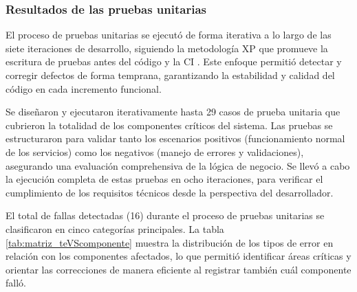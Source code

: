 \subsubsection{Resultados de las pruebas unitarias}

El proceso de pruebas unitarias se ejecutó de forma iterativa a lo largo de las siete iteraciones de desarrollo, 
siguiendo la metodología \ac{XP} que promueve la escritura de pruebas antes del código y la \ac{CI} \citep{beck2000extreme}. 
Este enfoque permitió detectar y corregir defectos de forma temprana, garantizando la estabilidad
y calidad del código en cada incremento funcional.

Se diseñaron y ejecutaron iterativamente hasta 29 casos de prueba unitaria que cubrieron la totalidad de los
componentes críticos del sistema. Las pruebas se estructuraron para validar tanto los escenarios positivos
(funcionamiento normal de los servicios) como los negativos (manejo de errores y validaciones), asegurando
una evaluación comprehensiva de la lógica de negocio. Se llevó a cabo la ejecución completa de estas
pruebas en ocho iteraciones, para verificar el cumplimiento de los requisitos técnicos desde la perspectiva
del desarrollador.

El total de fallas detectadas (16) durante el proceso de pruebas unitarias se 
clasificaron en cinco categorías principales. La tabla \ref{tab:matriz_teVScomponente} muestra la distribución de los tipos 
de error en relación con los componentes afectados, lo que permitió identificar áreas críticas y orientar 
las correcciones de manera eficiente al registrar también cuál componente falló.

